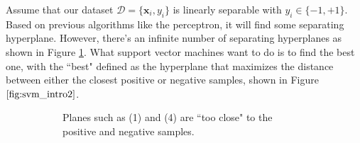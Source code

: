   \begin{example}
    \label{ex:svms-vs-other-classifiers-on-linearly-separable}
    Assume that our dataset $\mathcal{D} = \{\mathbf{x}_i, y_i\}$ is linearly separable with $y_i \in \{-1, +1\}$. Based on previous algorithms like the perceptron, it will find some separating hyperplane. However, there's an infinite number of separating hyperplanes as shown in Figure \ref{fig:svm_intro_1}. What support vector machines want to do is to find the best one, with the ``best" defined as the hyperplane that maximizes the distance between either the closest positive or negative samples, shown in Figure $\ref{fig:svm_intro2}$.  

    \begin{figure}[H] 
      \centering 
      \begin{subfigure}[b]{0.45\textwidth} 
        \centering 
        \caption{Planes such as (1) and (4) are ``too close" to the positive and negative samples. } 
        \label{fig:svm_intro_1}
      \end{subfigure}
      \hfill
      \begin{subfigure}[b]{0.45\textwidth} 
        \centering 
\end{subfigure}
\end{figure}
\end{example}
